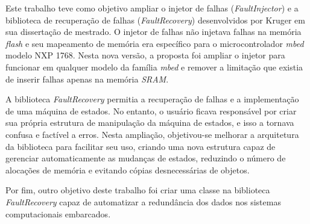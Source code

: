 Este trabalho teve como objetivo ampliar o injetor de falhas (\textit{FaultInjector}) e a biblioteca de recuperação de falhas (\textit{FaultRecovery}) desenvolvidos por Kruger \cite{Kruger:2014} em sua dissertação de mestrado. O injetor de falhas não injetava falhas na memória \textit{flash} e seu mapeamento de memória era específico para o microcontrolador \textit{mbed} modelo NXP 1768. Nesta nova versão, a proposta foi ampliar o injetor para funcionar em qualquer modelo da família \textit{mbed} e remover a limitação que existia de inserir falhas apenas na memória \textit{SRAM}.

A biblioteca \textit{FaultRecovery} permitia a recuperação de falhas e a implementação de uma máquina de estados. No entanto, o usuário ficava responsável por criar sua própria estrutura de manipulação da máquina de estados, e isso a tornava confusa e factível a erros. Nesta ampliação, objetivou-se melhorar a arquitetura da biblioteca para facilitar seu uso, criando uma nova estrutura capaz de gerenciar automaticamente as mudanças de estados, reduzindo o número de alocações de memória e evitando cópias desnecessárias de objetos.

Por fim, outro objetivo deste trabalho foi criar uma classe na biblioteca \textit{FaultRecovery} capaz de automatizar a redundância dos dados nos sistemas computacionais embarcados.



